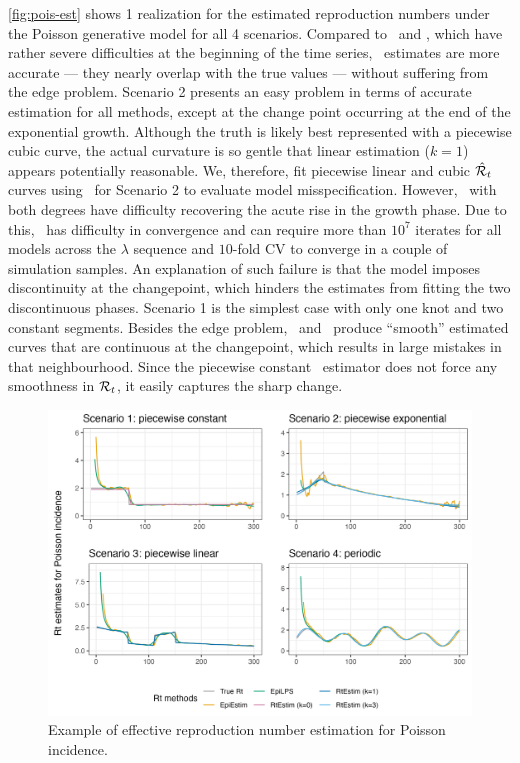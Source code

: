 \autoref{fig:pois-est} shows 1 realization for the estimated reproduction
numbers under the Poisson generative model for all 4 scenarios. Compared to
\EpiEstim\ and \EpiLPS, which have rather severe difficulties at the beginning
of the time series, \RtEstim\ estimates are more accurate --- they nearly overlap
with the true values --- without suffering from the edge problem. 
Scenario 2 presents an easy problem in terms of accurate estimation for all methods, 
except at the change point occurring at the end of the exponential growth. 
Although the truth is likely best represented with a piecewise cubic curve, the actual
curvature is so gentle that linear estimation ($k=1$) appears potentially
reasonable. We, therefore, fit piecewise linear and cubic $\hat{\mathcal{R}}_t$ curves
using \RtEstim\ for Scenario 2 to evaluate model misspecification. 
However, \RtEstim\ with both degrees have difficulty recovering the acute rise 
in the growth phase. Due to this, \RtEstim\ has difficulty in convergence and 
can require more than $10^7$ iterates for all models across the $\lambda$ sequence 
and $10$-fold CV to converge in a couple of simulation samples. 
An explanation of such failure is that the model imposes discontinuity at the
changepoint, which hinders the estimates from fitting the two discontinuous
phases. Scenario 1 is the simplest case with only one knot and two constant
segments. Besides the edge problem, \EpiEstim\ and \EpiLPS\ produce ``smooth''
estimated curves that are continuous at the changepoint, which results in
large mistakes in that neighbourhood. Since the piecewise constant 
\RtEstim\ estimator does not force any smoothness in $\mathcal{R}_t$, it easily 
captures the sharp change. 

\begin{figure}[tb]
    \centering
    \includegraphics[width=.99\textwidth]{fig/Pois-res-plot.png}
    \caption{Example of effective reproduction number estimation for Poisson incidence.}
    \label{fig:pois-est}
\end{figure}


